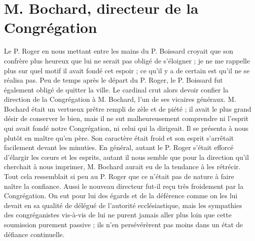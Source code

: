 \section*{M. Bochard, directeur de la Congrégation}
Le P. Roger en nous mettant entre les mains du P. Boissard croyait que son confrère plus heureux que lui ne serait pas obligé de s'éloigner ; je ne me rappelle plus sur quel motif il avait fondé cet espoir ; ce qu'il y a de certain est qu'il ne se réalisa pas. Peu de temps après le départ du P. Roger, le P. Boissard fut également obligé de quitter la ville. Le cardinal crut alors devoir confier la direction de la Congrégation à M. Bochard, l'un de ses vicaires généraux. M. Bochard était un vertueux prêtre rempli de zèle et de piété ; il avait le plus grand désir de conserver le bien, mais il ne sut malheureusement comprendre ni l'esprit qui avait fondé notre Congrégation, ni celui qui la dirigeait. Il se présenta à nous plutôt en maître qu'en père. Son caractère était froid et son esprit s'arrêtait facilement devant les minuties. En général, autant le P. Roger s'était efforcé d'élargir les cœurs et les esprits, autant il nous semble que pour la direction qu'il cherchait à nous imprimer, M. Bochard aurait eu de la tendance à les rétrécir. Tout cela ressemblait si peu au P. Roger que ce n'était pas de nature à faire naître la confiance. Aussi le nouveau directeur fut-il reçu très froidement par la Congrégation. On eut pour lui des égards et de la déférence comme on les lui devait en sa qualité de
délégué de l'autorité ecclésiastique, mais les sympathies des congréganistes vis-à-vis de lui ne purent jamais aller plus loin que cette soumission purement passive ; ils n'en persévérèrent pas moins dans un état de défiance continuelle.

